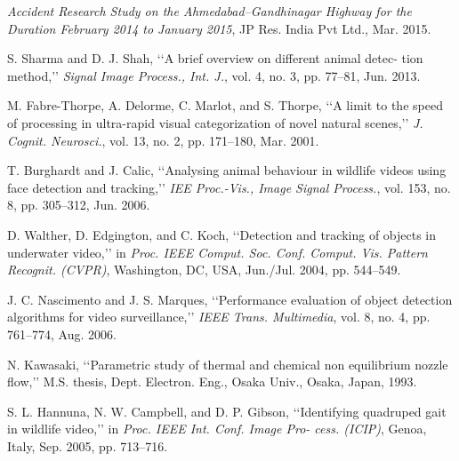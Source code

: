 \documentclass[14pt,a4paper,final]{extreport}
\begin{document}
\begin{thebibliography}{9}
{\fontsize{13pt}{8.4pt}\selectfont \textit{Accident Research Study on the Ahmedabad–Gandhinagar Highway for the Duration February 2014 to January 2015}, JP Res. India Pvt Ltd., Mar. 2015.\par}\par

{\fontsize{13pt}{8.4pt}\selectfont S. Sharma and D. J. Shah, ‘‘A brief overview on different animal detec- tion method,’’ \textit{Signal Image Process., Int. J.}, vol. 4, no. 3, pp. 77–81, Jun. 2013.\par}\par

{\fontsize{13pt}{8.4pt}\selectfont M. Fabre-Thorpe, A. Delorme, C. Marlot, and S. Thorpe, ‘‘A limit to the speed of processing in ultra-rapid visual categorization of novel natural scenes,’’ \textit{J. Cognit. Neurosci.}, vol. 13, no. 2, pp. 171–180, Mar. 2001.\par}\par

{\fontsize{13pt}{8.4pt}\selectfont T. Burghardt and J. Calic, ‘‘Analysing animal behaviour in wildlife videos using face detection and tracking,’’ \textit{IEE Proc.-Vis., Image Signal Process.}, vol. 153, no. 8, pp. 305–312, Jun. 2006.\par}\par

{\fontsize{13pt}{8.4pt}\selectfont D. Walther, D. Edgington, and C. Koch, ‘‘Detection and tracking of objects in underwater video,’’ in \textit{Proc. IEEE Comput. Soc. Conf. Comput. Vis. Pattern Recognit. (CVPR)}, Washington, DC, USA, Jun./Jul. 2004, pp. 544–549.\par}\par

{\fontsize{13pt}{8.4pt}\selectfont J. C. Nascimento and J. S. Marques, ‘‘Performance evaluation of object detection algorithms for video surveillance,’’ \textit{IEEE Trans. Multimedia}, vol. 8, no. 4, pp. 761–774, Aug. 2006.\par}\par

{\fontsize{13pt}{8.4pt}\selectfont N. Kawasaki, ‘‘Parametric study of thermal and chemical non equilibrium nozzle flow,’’ M.S. thesis, Dept. Electron. Eng., Osaka Univ., Osaka, Japan, 1993.\par}\par

{\fontsize{13pt}{8.4pt}\selectfont S. L. Hannuna, N. W. Campbell, and D. P. Gibson, ‘‘Identifying quadruped gait in wildlife video,’’ in \textit{Proc. IEEE Int. Conf. Image Pro- cess. (ICIP)}, Genoa, Italy, Sep. 2005, pp. 713–716.\par}\par


\end{thebibliography}
\end{document}
